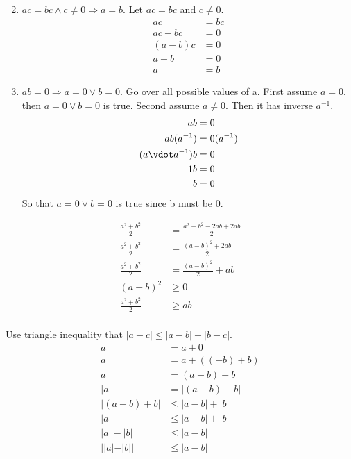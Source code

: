 \documentclass{homework}
\begin{document}
\begin{enumerate}
\begin{align*}
        \end{align*}
    \item $ac = bc \wedge  c \neq 0 \Rightarrow a = b$. Let $ac = bc$ and $c \neq 0$.
        \begin{align*}
            ac  &=  bc	\\
            ac - bc &=  0   \\
            (a-b) c &=  0   \\
            a - b   &=  0   \\
            a   &=  b
        \end{align*}
    \item $ab = 0 \Rightarrow a=0 \vee b=0$. Go over all possible values of a. First assume $a = 0$, then $a=0 \vee b=0$ is true. Second assume $a \neq 0$. Then it has inverse $a^{-1}$.
        \begin{align*}
            ab	&=	0	\\
            ab(a^{-1})	&=	0(a^{-1})	\\
            (a \vdot a^{-1}) b	&=	0	\\
            1 b	&=	0	\\
            b	&=	0	\\
        \end{align*} So that $a=0 \vee b=0$ is true since b must be 0.
\end{enumerate}


\question
\begin{align*}
    \frac{a^2 + b^2}{2}	&= \frac{a^2 + b^2 - 2ab + 2ab}{2}  \\
    \frac{a^2 + b^2}{2}	&= \frac{(a-b)^2 + 2ab}{2}  \\
    \frac{a^2 + b^2}{2}	&= \frac{(a-b)^2}{2} + ab  \\
    (a-b)^2 &\geq 0 \\
    \frac{a^2 + b^2}{2}	&\geq ab\\
\end{align*}


\question
Use triangle inequality that $|a - c| \leq |a - b| + |b - c|$.
\begin{align*}
    a   &=  a + 0   \\
    a   &=  a + ((-b) + b)	\\
    a   &=  (a-b) + b	\\
    |a|   &=  |(a-b) + b|	\\
    |(a-b) + b| &\leq |a-b| + |b|   \\
    |a| &\leq |a-b| + |b|   \\
    |a| - |b| &\leq |a-b|   \\
    ||a| - |b|| &\leq |a-b|   \\
\end{align*}
\end{document}
